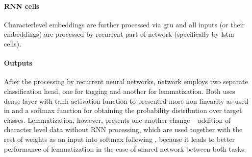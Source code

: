 \paragraph{RNN cells}
Characterlevel embeddings are further processed via \acrfull{gru} and all inputs (or their embeddings) are processed by recurrent part of network (specifically by \acrfull{lstm} cells).

\paragraph{Outputs}
After the processing by recurrent neural networks, network employs two separate classification head, one for tagging and another for lemmatization. Both uses dense layer with tanh activation function to presented more non-linearity as used in \citep{2018} and a softmax function for obtaining the probability distribution over target classes. Lemmatization, however, presents one another change -- addition of character level data without RNN processing, which are used together with the rest of weights as an input into softmax following \citep{Straka2018}, because it leads to better performance of lemmatization in the case of shared network between both tasks.

